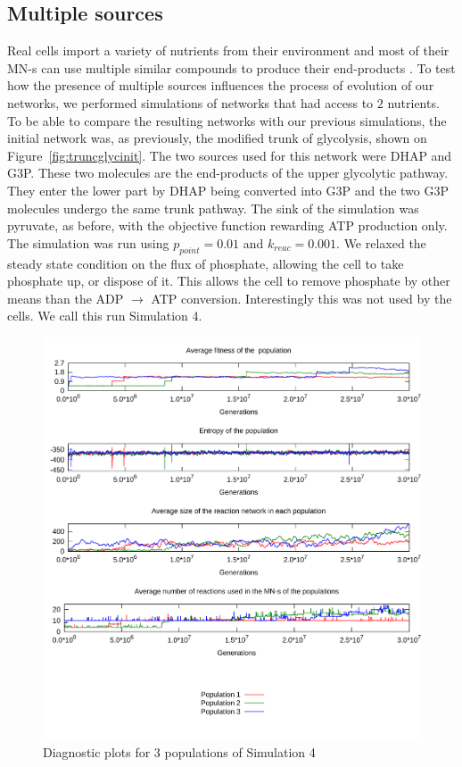 \documentclass[a4paper,12pt]{article}
\begin{document}
\subsection{Multiple sources}
\label{sub:multiple_sources_and_sinks}

Real cells import a variety of nutrients from their environment and most of their \mbox{MN-s} can use multiple similar compounds to produce their end-products \cite{latent}. To test how the presence of multiple sources influences the process of evolution of our networks, we performed simulations of networks that had access to $2$ nutrients. To be able to compare the resulting networks with our previous simulations, the initial network was, as previously, the modified trunk of glycolysis, shown on Figure~\ref{fig:truncglycinit}. The two sources used for this network were DHAP and G3P. These two molecules are the end-products of the upper glycolytic pathway. They enter the lower part by DHAP being converted into G3P and the two G3P molecules undergo the same trunk pathway. The sink of the simulation was pyruvate, as before, with the objective function rewarding ATP production only. The simulation was run using $p_{point}=0.01$ and $k_{reac}=0.001$. We relaxed the steady state condition on the flux of phosphate, allowing the cell to take phosphate up, or dispose of it. This allows the cell to remove phosphate by other means than the ADP $\rightarrow$ ATP conversion. Interestingly this was not used by the cells. We call this run Simulation 4.

\begin{figure}[htpb]
	\centering
	\includegraphics[width=1\linewidth]{simulationmultisource.pdf}
	\caption{Diagnostic plots for 3 populations of Simulation 4}
	\label{fig:simulationmultisource}
\end{figure}
\end{document}

